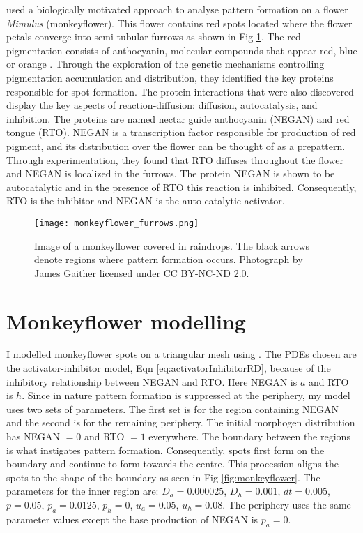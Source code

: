 \citep{Yuan2019} used a biologically motivated approach to analyse pattern formation on a flower \textit{Mimulus} (monkeyflower). This flower contains red spots located where the flower petals converge into semi-tubular furrows as shown in Fig \ref{fig:monkeyflower_real}. The red pigmentation consists of anthocyanin, molecular compounds that appear red, blue or orange \citep{bayer1966}. Through the exploration of the genetic mechanisms controlling pigmentation accumulation and distribution, they identified the key proteins responsible for spot formation. The protein interactions that were also discovered display the key aspects of reaction-diffusion: diffusion, autocatalysis, and inhibition. The proteins are named nectar guide anthocyanin (NEGAN) and red tongue (RTO). NEGAN is a transcription factor responsible for production of red pigment, and its distribution over the flower can be thought of as a prepattern. Through experimentation, they found that RTO diffuses throughout the flower and NEGAN is localized in the furrows. The protein NEGAN is shown to be autocatalytic and in the presence of RTO this reaction is inhibited. Consequently, RTO is the inhibitor and NEGAN is the auto-catalytic activator.

\begin{figure}[ht]
	\centering
	\texttt{[image: monkeyflower\_furrows.png]}
	\caption{Image of a monkeyflower covered in raindrops. The black arrows denote regions where pattern formation occurs. Photograph by James Gaither licensed under CC BY-NC-ND 2.0.}
	\label{fig:monkeyflower_real}
\end{figure}

\section{Monkeyflower modelling}
I modelled monkeyflower spots on a triangular mesh using \ProgramName{}. The PDEs chosen are the activator-inhibitor model, Eqn \eqref{eq:activatorInhibitorRD}, because of the inhibitory relationship between NEGAN and RTO. Here NEGAN is $a$ and RTO is $h$. Since in nature pattern formation is suppressed at the periphery, my model uses two sets of parameters. The first set is for the region containing NEGAN and the second is for the remaining periphery. The initial morphogen distribution has NEGAN $= 0$ and RTO $= 1$ everywhere. The boundary between the regions is what instigates pattern formation. Consequently, spots first form on the boundary and continue to form towards the centre. This procession aligns the spots to the shape of the boundary as seen in Fig \ref{fig:monkeyflower}. The parameters for the inner region are: $D_a=0.000025$, $D_h=0.001$, $dt=0.005$, $p=0.05$, $p_a=0.0125$, $p_h=0$, $u_a=0.05$, $u_h=0.08$. The periphery uses the same parameter values except the base production of NEGAN is $p_a=0$.

